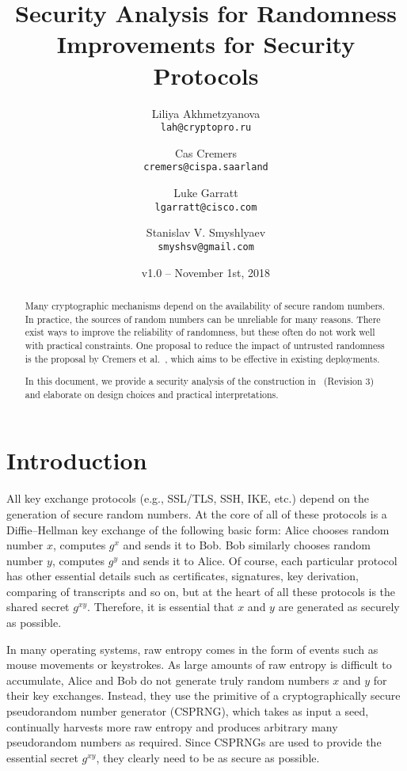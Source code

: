 \documentclass{article}
\author{
  Liliya Akhmetzyanova\\
  \texttt{lah@cryptopro.ru}
  \and
  Cas Cremers\\
  \texttt{cremers@cispa.saarland}
  \and
  Luke Garratt\\
  \texttt{lgarratt@cisco.com}
  \and
  Stanislav V. Smyshlyaev\\
  \texttt{smyshsv@gmail.com}
}
\title{Security Analysis for Randomness Improvements for Security
Protocols}
\date{v1.0 -- November 1st, 2018}
\begin{document}
  \maketitle


\begin{abstract}
Many cryptographic mechanisms depend on the availability of secure
	random numbers. In practice, the sources of random numbers can
	be unreliable for many reasons. There exist ways to improve the
	reliability of randomness, but these often do not work well with
	practical constraints.
	One proposal to reduce the impact of untrusted randomness is the
	proposal by Cremers et al.~\cite{randomnessirtf}, which aims to
	be effective in existing deployments.

	In this document, we provide a security analysis of the
	construction in~\cite{randomnessirtf} (Revision 3) and elaborate
	on design choices and practical interpretations.
\end{abstract}

\section{Introduction}
All key exchange protocols (e.g., SSL/TLS, SSH, IKE, etc.) depend on the generation of secure random numbers. At the core of all of these protocols is a Diffie--Hellman key exchange of the following basic form: Alice chooses random number $x$, computes $g^x$ and sends it to Bob. Bob similarly chooses random number $y$, computes $g^y$ and sends it to Alice. Of course, each particular protocol has other essential details such as certificates, signatures, key derivation, comparing of transcripts and so on, but at the heart of all these protocols is the shared secret $g^{xy}$. Therefore, it is essential that $x$ and $y$ are generated as securely as possible. 

In many operating systems, raw entropy comes in the form of events such as mouse movements or keystrokes. As large amounts of raw entropy is difficult to accumulate, Alice and Bob do not generate truly random numbers $x$ and $y$ for their key exchanges. Instead, they use the primitive of a cryptographically secure pseudorandom number generator (CSPRNG), which takes as input a seed, continually harvests more raw entropy and  produces arbitrary many pseudorandom numbers as required. Since CSPRNGs are used to provide the essential secret $g^{xy}$, they clearly need to be as secure as possible. 
\end{document}
